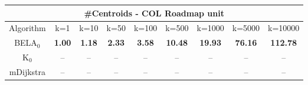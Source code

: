 \begin{tabular}{c|cccccccc}\toprule
\multicolumn{9}{c}{#Centroids - COL Roadmap unit}\\ \midrule
Algorithm & k=1 & k=10 & k=50 & k=100 & k=500 & k=1000 & k=5000 & k=10000 \\ \midrule
BELA$_0$ & \textbf{1.00} & \textbf{1.18} & \textbf{2.33} & \textbf{3.58} & \textbf{10.48} & \textbf{19.93} & \textbf{76.16} & \textbf{112.78} \\
K$_0$ & -- & -- & -- & -- & -- & -- & -- & -- \\
mDijkstra & -- & -- & -- & -- & -- & -- & -- & -- \\ \bottomrule 
\end{tabular}
